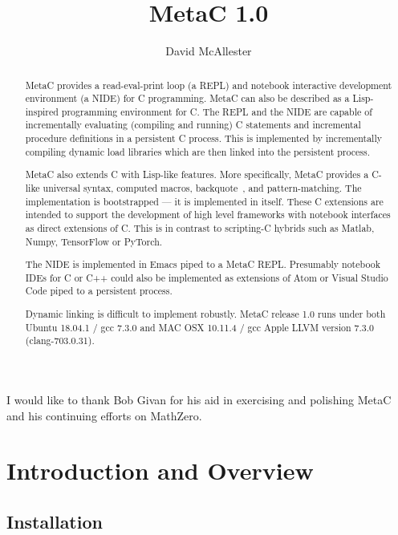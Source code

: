 \documentclass{article}
\title{MetaC 1.0}
\author{David McAllester}
\begin{document}
\maketitle

\begin{abstract}
  MetaC provides a read-eval-print loop (a REPL) and notebook interactive development environment (a NIDE) for C programming.
  MetaC can also be described as a Lisp-inspired programming environment for C.
  The REPL and the NIDE  are capable of incrementally evaluating (compiling and running)
  C statements and incremental procedure definitions in a persistent C process.  This is implemented by incrementally compiling dynamic load libraries
  which are then linked into the persistent process.

  MetaC also extends C with Lisp-like features. More specifically, MetaC provides a C-like universal syntax,
  computed macros, backquote~\cite{backquote}, and pattern-matching.
  The implementation is bootstrapped --- it is implemented in itself.  These C extensions are intended to support the development of high level
  frameworks with notebook interfaces as direct extensions of C.  This is in contrast to scripting-C hybrids such as Matlab, Numpy, TensorFlow or PyTorch.

  The NIDE is implemented in Emacs piped to a MetaC REPL.  Presumably notebook IDEs for C or C++ could also be implemented as extensions
  of Atom or Visual Studio Code piped to a persistent process.

  Dynamic linking is difficult to implement robustly.
  MetaC release 1.0 runs under both Ubuntu 18.04.1 / gcc 7.3.0 and MAC OSX 10.11.4 / gcc Apple LLVM version 7.3.0 (clang-703.0.31).
\end{abstract}

\vfill
{}  I would like to thank Bob Givan for his aid in exercising and polishing MetaC and his continuing efforts on MathZero.
\newpage

\tableofcontents

\newpage

\section{Introduction and Overview}

\subsection{Installation}
\end{document}
